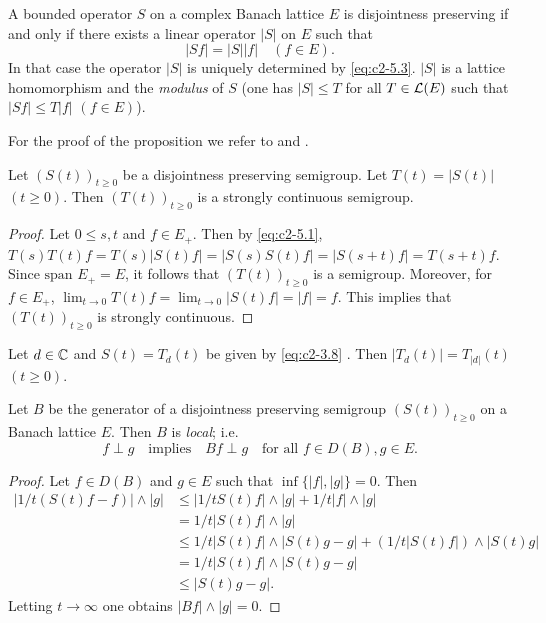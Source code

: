 \begin{proposition}\label{prop:c2-5.1}
A bounded operator $S$ on a complex Banach lattice $E$ is disjointness preserving if and only if there exists a linear operator $|S|$ on $E$ such that
\begin{equation}\label{eq:c2-5.3}
|Sf| = |S||f| \quad (f \in E).
\end{equation}
In that case the operator $|S|$ is uniquely determined by \eqref{eq:c2-5.3}.
$|S|$ is a lattice homomorphism and the \emph{modulus} of $S$ (\ie one has
$|S| \leq T$ for all $T \in \mathcal{L}(E)$ such that $|Sf| \leq T|f|$ $(f \in E)$).
\end{proposition}

For the proof of the proposition we refer to \citet{arendt:1983} and \citet{depagter:1984}.

\begin{proposition}\label{prop:c2-5.2}
Let $(S(t))_{t \geq 0}$ be a disjointness preserving semigroup. 
Let $T(t) = |S(t)|$ $(t \geq 0)$. 
Then $(T(t))_{t \geq 0}$ is a strongly continuous semigroup.
\end{proposition}

\begin{proof}
Let $0 \leq s,t$ and $f \in E_{+}$. 
Then by \eqref{eq:c2-5.1}, $T(s)T(t)f = T(s)|S(t)f| = |S(s)S(t)f| = |S(s+t)f| = T(s+t)f$. 
Since $\text{span } E_{+} = E$, it follows that $(T(t))_{t \geq 0}$ is a semigroup. 
Moreover, for $f \in E_{+}$, $\lim_{t \to 0} T(t)f = \lim_{t \to 0} |S(t)f| = |f| = f$. 
This implies that $(T(t))_{t \geq 0}$ is strongly continuous.
\end{proof}
\begin{example}\label{ex:c2-5.3}
Let $d \in \mathbb{C}$ and $S(t) = T_{d}(t)$ be given by \ref{eq:c2-3.8}  . 
Then $|T_{d}(t)| = T_{|d|}(t)$ $(t \geq 0)$.
\end{example}

\begin{proposition}\label{prop:c2-5.4}
Let $B$ be the generator of a disjointness preserving semigroup $(S(t))_{t \geq 0}$ on a Banach lattice $E$. 
Then $B$ is \emph{local}; i.e.
\begin{equation}\label{eq:c2-5.4}
f \perp g \quad \text{implies} \quad Bf \perp g \quad \text{for all } f \in D(B), g \in E.
\end{equation}
\end{proposition}

\begin{proof}
Let $f \in D(B)$ and $g \in E$ such that $\inf\{|f|,|g|\} = 0$. 
Then
\begin{align*}
|1/t(S(t)f - f)| \wedge |g| &\leq |1/tS(t)f| \wedge |g| + 1/t|f| \wedge |g|\\
&= 1/t |S(t)f| \wedge |g|\\
&\leq 1/t |S(t)f| \wedge |S(t)g -g| + (1/t|S(t)f|) \wedge |S(t)g|\\
&= 1/t |S(t)f| \wedge |S(t)g - g|\\
&\leq |S(t)g - g|.
\end{align*}
Letting $t \to \infty$ one obtains $|Bf| \wedge |g| = 0$.
\end{proof}

